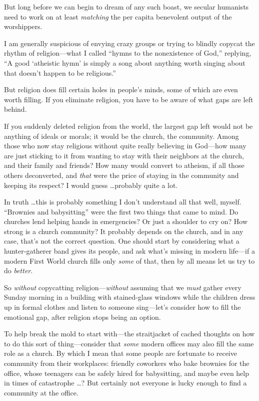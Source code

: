 {
 But long before we can begin to dream of any such boast, we
secular humanists need to work on at least \textit{matching} the per
capita benevolent output of the worshippers.}

\myendsectiontext


{
 I am generally suspicious of envying crazy groups or trying to
blindly copycat the rhythm of religion---what I called
``hymns to the nonexistence of
God,'' replying, ``A good
`atheistic hymn' is simply a song about
anything worth singing about that doesn't happen to be
religious.'' }

{
 But religion does fill certain holes in people's
minds, some of which are even worth filling. If you eliminate religion,
you have to be aware of what gaps are left behind.}

{
 If you suddenly deleted religion from the world, the largest gap
left would not be anything of ideals or morals; it would be the church,
the community. Among those who now stay religious without quite really
believing in God---how many are just sticking to it from wanting to
stay with their neighbors at the church, and their family and friends?
How many would convert to atheism, if all those others deconverted, and
\textit{that} were the price of staying in the community and keeping
its respect? I would guess \ldots probably quite a lot.}

{
 In truth \ldots this is probably something I don't
understand all that well, myself. ``Brownies and
babysitting'' were the first two things that came to
mind. Do churches lend helping hands in emergencies? Or just a shoulder
to cry on? How strong is a church community? It probably depends on the
church, and in any case, that's not the correct
question. One should start by considering what a hunter-gatherer band
gives its people, and ask what's missing in modern
life---if a modern First World church fills only \textit{some} of that,
then by all means let us try to do \textit{better}.}

{
 So \textit{without} copycatting religion---\textit{without}
assuming that we \textit{must} gather every Sunday morning in a
building with stained-glass windows while the children dress up in
formal clothes and listen to someone sing---let's
consider how to fill the emotional gap, after religion stops being an
option.}

{
 To help break the mold to start with---the straitjacket of cached
thoughts on how to do this sort of thing---consider that \textit{some}
modern offices may also fill the same role as a church. By which I mean
that some people are fortunate to receive community from their
workplaces: friendly coworkers who bake brownies for the office, whose
teenagers can be safely hired for babysitting, and maybe even help in
times of catastrophe \ldots ? But certainly not everyone is lucky enough
to find a community at the office.}

